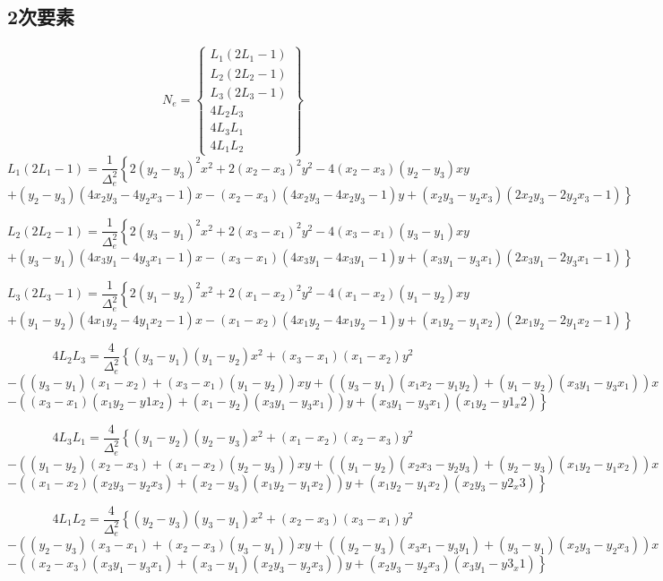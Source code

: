\documentclass{jarticle}
\begin{document}
\subsection{2次要素}
\begin{equation}
N_e = \left\{\begin{array}{c}
      L_1(2L_1-1)\\
      L_2(2L_2-1)\\
      L_3(2L_3-1)\\
      4L_2L_3\\
      4L_3L_1\\
      4L_1L_2
\end{array}\right\}
\end{equation}
\[
  L_1(2L_1-1)= \frac{1}{\Delta_e^2}\left\{
  2(y_2-y_3)^2x^2+2(x_2-x_3)^2y^2-4(x_2-x_3)(y_2-y_3)xy\right.
\]
\[\left.
+(y_2-y_3)(4x_2y_3-4y_2x_3-1)x-(x_2-x_3)(4x_2y_3-4x_2y_3-1)y+(x_2y_3-y_2x_3)(2x_2y_3-2y_2x_3-1)\right\}
\]

\[
  L_2(2L_2-1)= \frac{1}{\Delta_e^2}\left\{
  2(y_3-y_1)^2x^2+2(x_3-x_1)^2y^2-4(x_3-x_1)(y_3-y_1)xy\right.
\]
\[\left.
+(y_3-y_1)(4x_3y_1-4y_3x_1-1)x-(x_3-x_1)(4x_3y_1-4x_3y_1-1)y+(x_3y_1-y_3x_1)(2x_3y_1-2y_3x_1-1)\right\}
\]

\[
  L_3(2L_3-1)= \frac{1}{\Delta_e^2}\left\{
  2(y_1-y_2)^2x^2+2(x_1-x_2)^2y^2-4(x_1-x_2)(y_1-y_2)xy\right.
\]
\[\left.
+(y_1-y_2)(4x_1y_2-4y_1x_2-1)x-(x_1-x_2)(4x_1y_2-4x_1y_2-1)y+(x_1y_2-y_1x_2)(2x_1y_2-2y_1x_2-1)\right\}
\]


\[
4L_2L_3 = \frac{4}{\Delta_e^2}\left\{ (y_3-y_1)(y_1-y_2)x^2+(x_3-x_1)(x_1-x_2)y^2
\right.\]\[\left.
-((y_3-y_1)(x_1-x_2)+(x_3-x_1)(y_1-y_2))xy
+((y_3-y_1)(x_1x_2-y_1y_2)+(y_1-y_2)(x_3y_1-y_3x_1))x
\right.\]\[\left.
-((x_3-x_1)(x_1y_2-y1x_2)+(x_1-y_2)(x_3y_1-y_3x_1))y+(x_3y_1-y_3x_1)(x_1y_2-y1_x2) \right\}
\]


\[
4L_3L_1 = \frac{4}{\Delta_e^2}\left\{ (y_1-y_2)(y_2-y_3)x^2+(x_1-x_2)(x_2-x_3)y^2
\right.\]\[\left.
-((y_1-y_2)(x_2-x_3)+(x_1-x_2)(y_2-y_3))xy
+((y_1-y_2)(x_2x_3-y_2y_3)+(y_2-y_3)(x_1y_2-y_1x_2))x
\right.\]\[\left.
-((x_1-x_2)(x_2y_3-y_2x_3)+(x_2-y_3)(x_1y_2-y_1x_2))y+(x_1y_2-y_1x_2)(x_2y_3-y2_x3) \right\}
\]


\[
4L_1L_2 = \frac{4}{\Delta_e^2}\left\{ (y_2-y_3)(y_3-y_1)x^2+(x_2-x_3)(x_3-x_1)y^2
\right.\]\[\left.
-((y_2-y_3)(x_3-x_1)+(x_2-x_3)(y_3-y_1))xy
+((y_2-y_3)(x_3x_1-y_3y_1)+(y_3-y_1)(x_2y_3-y_2x_3))x
\right.\]\[\left.
-((x_2-x_3)(x_3y_1-y_3x_1)+(x_3-y_1)(x_2y_3-y_2x_3))y+(x_2y_3-y_2x_3)(x_3y_1-y3_x1) \right\}
\]
\end{document}

